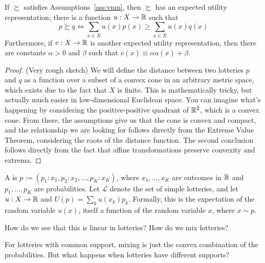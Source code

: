 \documentclass[12pt]{article}
\begin{document}
\begin{theorem}\label{thm:vnm}
	 If $\succsim$ satisfies Assumptions~\ref{ass:vnm}, then $\succsim$ has an expected utility representation; there is a function $u: X \to \mathbb{R}$ such that
	\[
	p \succsim q \Longleftrightarrow \sum_{x \in X} u(x)p(x) \ge \sum_{x \in X} u(x)q(x)
	\]
	Furthermore, if $v: X \to \mathbb{R}$ is another expected utility representation, then there are constants $\alpha > 0$ and $\beta$ such that $v(x) \equiv \alpha u(x) + \beta$.
\end{theorem}
\begin{proof}
	(Very rough sketch) We will define the distance between two lotteries $p$ and $q$ as a function over a subset of a convex cone in an arbitrary metric space, which exists due to the fact that $X$ is finite. This is mathematically tricky, but actually much easier in low-dimensional Euclidean space. You can imagine what's happening by considering the positive-positive quadrant of $\mathbb{R}^2$, which is a convex cone. From there, the assumptions give us that the cone is convex and compact, and the relationship we are looking for follows directly from the Extreme Value Theorem, considering the roots of the distance function. The second conclusion follows directly from the fact that affine transformations preserve convexity and extrema.
\end{proof}

\begin{definition}
	A  is $p:= (p_1 : x_1,p_2:x_2,\dots,p_K:x_K)$, where $x_1,\dots,x_K$ are outcomes in $\mathbb{R}$ and $p_1,\dots,p_K$ are probabilities. Let $\mathcal{L}$ denote the set of simple lotteries, and let $u: X \to \mathbb{R}$ and $U(p) = \sum_{k} u(x_k)p_k$. Formally, this is the expectation of the random variable $u(x)$, itself a function of the random variable $x$, where $x \sim p$.
\end{definition}

\begin{question}
	How do we see that this is linear in lotteries? How do we mix lotteries?
\end{question}

For lotteries with common support, mixing is just the convex combination of the probabilities. But what happens when lotteries have different supports?
\end{document}
